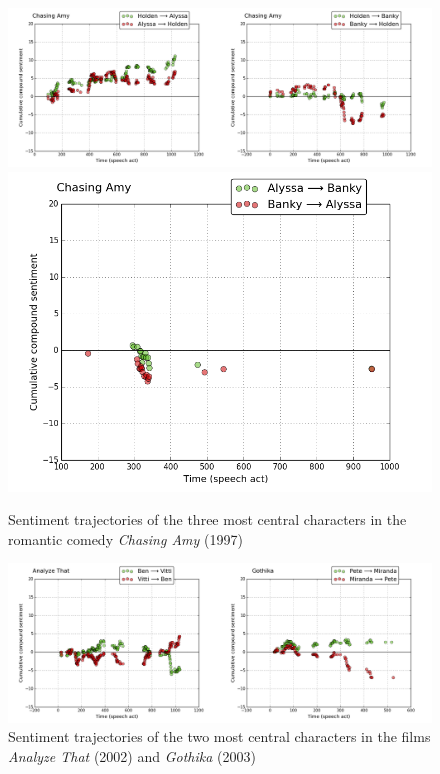 \documentclass[bsc,frontabs,deptreport,singlespacing,parskip, twoside]{infthesis}
\begin{document}
\begin{figure}[h!]
\begin{adjustwidth}{-0.5in}{-0.5in}
	\centering
		\includegraphics[scale=0.43]{figures/chasing_amy1}
		\includegraphics[scale=0.43]{figures/chasing_amy2}
	\caption{Sentiment trajectories of the three most central characters in the romantic comedy 
\textit{Chasing Amy} (1997)}
	\label{fig:chasing_amy}
\end{adjustwidth}
\end{figure}

\begin{figure}[h!]
\begin{adjustwidth}{-0.5in}{-0.5in}
	\centering
	\includegraphics[scale=0.43]{figures/y_contradictions}
	\caption{Sentiment trajectories of the two most central characters in the films \textit{Analyze That} (2002) and \textit{Gothika} (2003)}
	\label{fig:contradictions}
\end{adjustwidth}
\end{figure}
\end{document}
